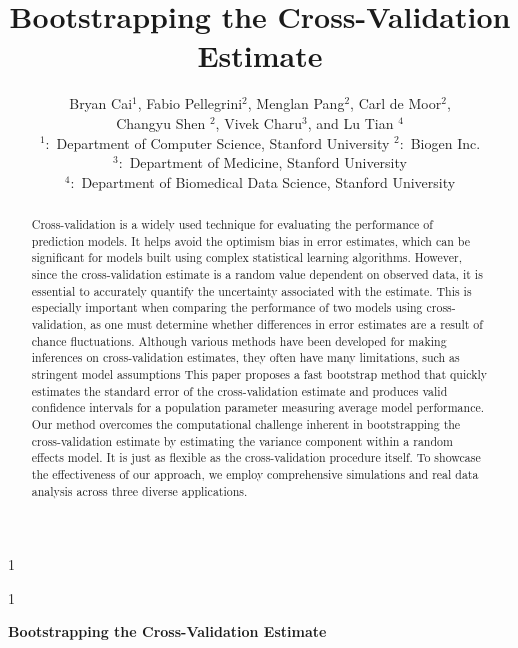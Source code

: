\documentclass[12pt]{article}
\newcommand{\blind}{1}
\begin{document}
%

\def\spacingset#1{\renewcommand{\baselinestretch}%
{#1}\small\normalsize} \spacingset{1}



\blind
{
  \title{\bf Bootstrapping the Cross-Validation Estimate}
  \author{Bryan Cai$^1$,  Fabio Pellegrini$^2$, Menglan Pang$^2$, Carl de Moor$^2$,\\
  Changyu Shen $^2$, Vivek Charu$^3$, and Lu Tian $^4$ %
   \vspace{1 cm}\\
   {\small $^1:$ Department of Computer Science, Stanford University $^2:$ Biogen Inc.} \\
   {\small $^3:$ Department of Medicine,  Stanford University}\\
   {\small $^4:$ Department of Biomedical Data Science, Stanford University}
    }
  \maketitle
} \fi

\blind
{
  \bigskip
  \bigskip
  \bigskip
  \begin{center}
    {\LARGE\bf Bootstrapping the Cross-Validation Estimate}
\end{center}
  \medskip
} \fi

\bigskip
\begin{abstract}
Cross-validation is a widely used technique for evaluating the performance of prediction models. It helps avoid the optimism bias in error estimates, which can be significant for models built using complex statistical learning algorithms. However, since the cross-validation estimate is a random value dependent on observed data, it is essential to accurately quantify the uncertainty associated with the estimate. This is especially important when comparing the performance of two models using cross-validation, as one must determine whether differences in error estimates are a result of chance fluctuations. Although various methods have been developed for making inferences on cross-validation estimates, they often have many limitations, such as stringent model assumptions This paper proposes a fast bootstrap method that quickly estimates the standard error of the cross-validation estimate and produces valid confidence intervals for a population parameter measuring average model performance. Our method overcomes the computational challenge inherent in bootstrapping the cross-validation estimate by estimating the variance component within a random effects model. It is just as flexible as the cross-validation procedure itself. To showcase the effectiveness of our approach, we employ comprehensive simulations and real data analysis across three diverse applications.
\end{abstract}
\end{document}
